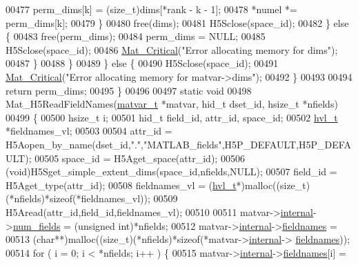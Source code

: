 \begin{DoxyCode}
00477                     perm\_dims[k] = (size\_t)dims[*rank - k - 1];
00478                     *numel *= perm\_dims[k];
00479                 \}
00480                 free(dims);
00481                 H5Sclose(space\_id);
00482             \} \textcolor{keywordflow}{else} \{
00483                 free(perm\_dims);
00484                 perm\_dims = NULL;
00485                 H5Sclose(space\_id);
00486                 \hyperlink{group__mat__util_gaf51f2bfbb5580f575e4dd79757e2b80c}{Mat\_Critical}(\textcolor{stringliteral}{"Error allocating memory for dims"});
00487             \}
00488         \}
00489     \} \textcolor{keywordflow}{else} \{
00490         H5Sclose(space\_id);
00491         \hyperlink{group__mat__util_gaf51f2bfbb5580f575e4dd79757e2b80c}{Mat\_Critical}(\textcolor{stringliteral}{"Error allocating memory for matvar->dims"});
00492     \}
00493 
00494     \textcolor{keywordflow}{return} perm\_dims;
00495 \}
00496 
00497 \textcolor{keyword}{static} \textcolor{keywordtype}{void}
00498 Mat\_H5ReadFieldNames(\hyperlink{group___m_a_t_structmatvar__t}{matvar\_t} *matvar, hid\_t dset\_id, hsize\_t *nfields)
00499 \{
00500     hsize\_t  i;
00501     hid\_t    field\_id, attr\_id, space\_id;
00502     \hyperlink{structhvl__t}{hvl\_t}   *fieldnames\_vl;
00503 
00504     attr\_id = H5Aopen\_by\_name(dset\_id,\textcolor{stringliteral}{"."},\textcolor{stringliteral}{"MATLAB\_fields"},H5P\_DEFAULT,H5P\_DEFAULT);
00505     space\_id = H5Aget\_space(attr\_id);
00506     (void)H5Sget\_simple\_extent\_dims(space\_id,nfields,NULL);
00507     field\_id = H5Aget\_type(attr\_id);
00508     fieldnames\_vl = (\hyperlink{structhvl__t}{hvl\_t}*)malloc((\textcolor{keywordtype}{size\_t})(*nfields)*\textcolor{keyword}{sizeof}(*fieldnames\_vl));
00509     H5Aread(attr\_id,field\_id,fieldnames\_vl);
00510 
00511     matvar->\hyperlink{group___m_a_t_a6e97e3ed9f40c49322c18561c2a94e92}{internal}->\hyperlink{structmatvar__internal_a93fc447484f455eddf9334f2e9e411c2}{num\_fields} = (\textcolor{keywordtype}{unsigned} int)*nfields;
00512     matvar->\hyperlink{group___m_a_t_a6e97e3ed9f40c49322c18561c2a94e92}{internal}->\hyperlink{structmatvar__internal_a7574d000bfc98ad4860ae6590b8d4985}{fieldnames} =
00513         (\textcolor{keywordtype}{char}**)malloc((\textcolor{keywordtype}{size\_t})(*nfields)*\textcolor{keyword}{sizeof}(*matvar->\hyperlink{group___m_a_t_a6e97e3ed9f40c49322c18561c2a94e92}{internal}->
      \hyperlink{structmatvar__internal_a7574d000bfc98ad4860ae6590b8d4985}{fieldnames}));
00514     \textcolor{keywordflow}{for} ( i = 0; i < *nfields; i++ ) \{
00515         matvar->\hyperlink{group___m_a_t_a6e97e3ed9f40c49322c18561c2a94e92}{internal}->\hyperlink{structmatvar__internal_a7574d000bfc98ad4860ae6590b8d4985}{fieldnames}[i] =

\end{DoxyCode}
